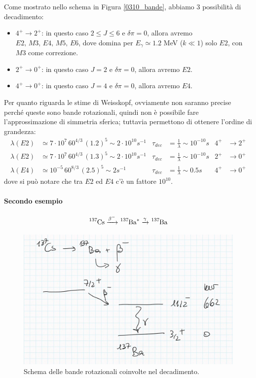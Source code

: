 \noindent Come mostrato nello schema in Figura \ref{0310_bande}, abbiamo 3 possibilità di decadimento:
\begin{itemize}
    \item $4^+\to2^+$: in questo caso $2\leq J\leq 6$ e $\delta \pi = 0$, allora avremo $E2,\,M3,\,E4,\,M5,\,E6$, dove domina per $E_\gamma\simeq 1.2$ MeV ($k\ll 1$) solo $E2$, con $M3$ come correzione.
    \item $2^+\to0^+$: in questo caso $J=2$ e $\delta \pi = 0$, allora avremo $E2$.
    \item $4^+\to0^+$: in questo caso $J=4$ e $\delta \pi = 0$, allora avremo $E4$.
\end{itemize}
\noindent  Per quanto riguarda le stime di Weisskopf, ovviamente non saranno precise perché queste sono bande rotazionali, quindi non è possibile fare l'approssimazione di simmetria sferica; tuttavia permettono di ottenere l'ordine di grandezza:
\begin{displaymath}
\begin{aligned}
\lambda(E2) &\simeq 7\cdot 10^7 \, 60^{4/3}\, (1.2)^5 \sim 2\cdot 10^{10} \unit{s}^{-1} & \tau_{dec} &= \frac{1}{\lambda} \sim 10^{-10} \unit{s} & 4^+&\to2^+ \\
%
\lambda(E2) &\simeq 7\cdot 10^7 \, 60^{4/3}\, (1.3)^5 \sim 2\cdot 10^{10} \unit{s}^{-1} & \tau_{dec} &= \frac{1}{\lambda} \sim 10^{-10} \unit{s} & 2^+&\to0^+ \\
%
\lambda(E4) &\simeq 10^{-5} \, 60^{8/3}\, (2.5)^5 \sim 2 \unit{s}^{-1} & \tau_{dec} &= \frac{1}{\lambda} \sim 0.5 \unit{s} & 4^+&\to0^+ 
\end{aligned}
\end{displaymath}
dove si può notare che tra $E2$ ed $E4$ c'è un fattore $10^{10}$. 

\paragraph{Secondo esempio}
$$\ce{^{137}Cs}  \xrightarrow{\beta^-} \ce{^{137}Ba}^*  \xrightarrow{\gamma}  \ce{^{137}Ba}$$

\begin{figure}[h]
    \centering
    \includegraphics[scale=0.2]{Immagini/0310_bande2.png}
    \caption{Schema delle bande rotazionali coinvolte nel decadimento.}
    \label{0310_bande1}
\end{figure}

